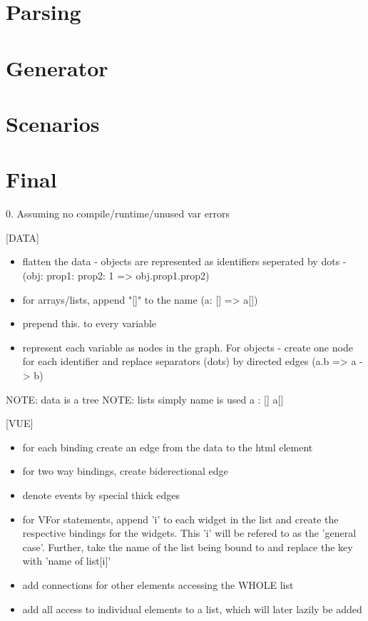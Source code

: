 \section{Parsing}
\section{Generator}
\section{Scenarios}

\section{Final}

0. Assuming no compile/runtime/unused var errors 

[DATA]
\begin{itemize}
\item flatten the data - objects are represented as identifiers seperated by dots - (obj: {prop1: {prop2: 1}} => obj.prop1.prop2)
\item for arrays/lists, append "[]" to the name (a: [] => a[])
\item prepend this. to every variable
\item represent each variable as nodes in the graph. For objects - create one node for each identifier and replace separators (dots) by directed edges (a.b => a -> b)  
\end{itemize}
NOTE: data is a tree
NOTE: lists simply name is used a : [] a[]

[VUE]
\begin{itemize}
\item for each binding create an edge from the data to the html element
\item for two way bindings, create biderectional edge
\item denote events by special thick edges
\item for VFor statements, append 'i' to each widget in the list and create the respective bindings for the widgets. This 'i' will be refered to as the 'general case'. Further, take the name of the list being bound to and replace the key with 'name of list[i]'
\item add connections for other elements accessing the WHOLE list
\item add all access to individual elements to a list, which will later lazily be added

\end{itemize}

